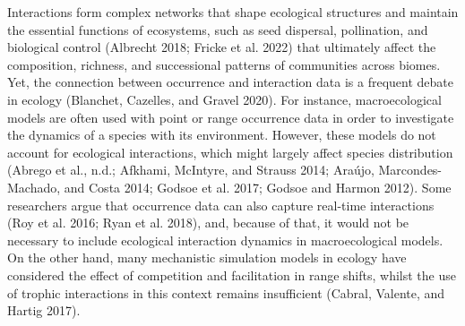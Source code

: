 \documentclass[11pt]{article}
\begin{document}
Interactions form complex networks that shape ecological structures and
maintain the essential functions of ecosystems, such as seed dispersal,
pollination, and biological control (Albrecht 2018; Fricke et al. 2022)
that ultimately affect the composition, richness, and successional
patterns of communities across biomes. Yet, the connection between
occurrence and interaction data is a frequent debate in ecology
(Blanchet, Cazelles, and Gravel 2020). For instance, macroecological
models are often used with point or range occurrence data in order to
investigate the dynamics of a species with its environment. However,
these models do not account for ecological interactions, which might
largely affect species distribution (Abrego et al., n.d.; Afkhami,
McIntyre, and Strauss 2014; Araújo, Marcondes-Machado, and Costa 2014;
Godsoe et al. 2017; Godsoe and Harmon 2012). Some researchers argue that
occurrence data can also capture real-time interactions (Roy et al.
2016; Ryan et al. 2018), and, because of that, it would not be necessary
to include ecological interaction dynamics in macroecological models. On
the other hand, many mechanistic simulation models in ecology have
considered the effect of competition and facilitation in range shifts,
whilst the use of trophic interactions in this context remains
insufficient (Cabral, Valente, and Hartig 2017).
\end{document}
